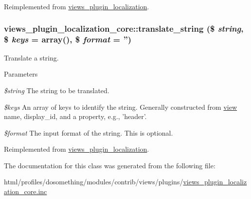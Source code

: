 Reimplemented from \hyperlink{classviews__plugin__localization_ae3c306214c21380853b27eeb902cadac}{views\_\-plugin\_\-localization}.\hypertarget{classviews__plugin__localization__core_a01ca45e9578f631df900513ecceb1616}{
\subsubsection[{translate\_\-string}]{\setlength{\rightskip}{0pt plus 5cm}views\_\-plugin\_\-localization\_\-core::translate\_\-string (\$ {\em string}, \/  \$ {\em keys} = {\ttfamily array()}, \/  \$ {\em format} = {\ttfamily ''})}}
\label{classviews__plugin__localization__core_a01ca45e9578f631df900513ecceb1616}
Translate a string.


\begin{DoxyParams}{Parameters}
\item[{\em \$string}]The string to be translated. \item[{\em \$keys}]An array of keys to identify the string. Generally constructed from \hyperlink{classview}{view} name, display\_\-id, and a property, e.g., 'header'. \item[{\em \$format}]The input format of the string. This is optional. \end{DoxyParams}


Reimplemented from \hyperlink{classviews__plugin__localization_a5c8353f0c80d4cf160e36133316f0a59}{views\_\-plugin\_\-localization}.

The documentation for this class was generated from the following file:\begin{DoxyCompactItemize}
\item 
html/profiles/dosomething/modules/contrib/views/plugins/\hyperlink{views__plugin__localization__core_8inc}{views\_\-plugin\_\-localization\_\-core.inc}\end{DoxyCompactItemize}
